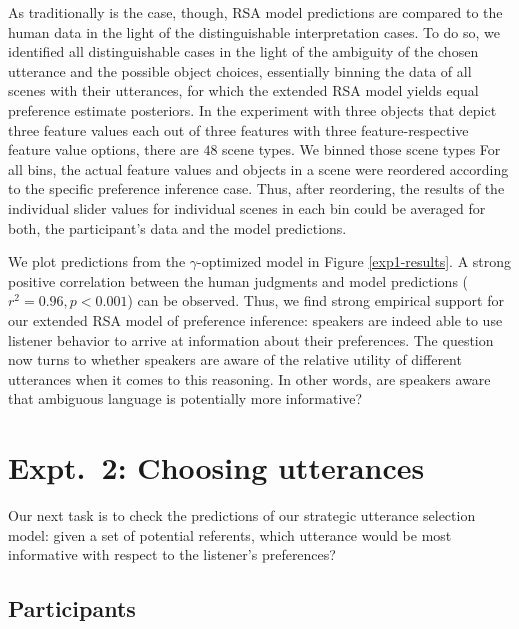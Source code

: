 \documentclass[10pt,a4paper]{article}
\begin{document}
As traditionally is the case, though, RSA model predictions are compared to the human data in the light of the distinguishable interpretation cases. 
To do so, we identified all distinguishable cases in the light of the ambiguity of the chosen utterance and the possible object choices, essentially binning the data of all scenes with their utterances, for which the extended RSA model yields equal preference estimate posteriors. 
In the experiment with three objects that depict three feature values each out of three features with three feature-respective feature value options, there are $48$ scene types.
We binned those scene types 
For all bins, the actual feature values and objects in a scene were reordered according to the specific preference inference case. 
Thus, after reordering, the results of the individual slider values for individual scenes in each bin could be averaged for both, the participant's data and the model predictions. 


We plot predictions from the $\gamma$-optimized model in Figure \ref{exp1-results}.
A strong positive correlation between the human judgments and model predictions ($r^2 = 0.96, p < 0.001$) can be observed. Thus, we find strong empirical support for our extended RSA model of preference inference: speakers are indeed able to use listener behavior to arrive at information about their preferences. The question now turns to whether speakers are aware of the relative utility of different utterances when it comes to this reasoning. In other words, are speakers aware that ambiguous language is potentially more informative?




\section{Expt.~2: Choosing utterances}

Our next task is to check the predictions of our strategic utterance selection model: given a set of potential referents, which utterance would be most informative with respect to the listener's preferences?

\subsection{Participants}
\end{document}
